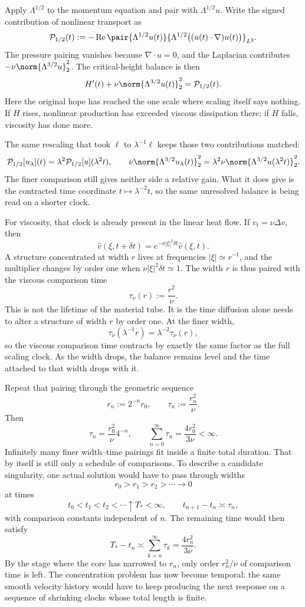 Apply \(\Lambda^{1/2}\) to the momentum equation and pair with \(\Lambda^{1/2}u\). Write the signed contribution of nonlinear transport as
\[
  \mathcal P_{1/2}(t)
  :=
  -\operatorname{Re}
  \pair
    {\Lambda^{1/2}u(t)}
    {\Lambda^{1/2}\bigl((u(t)\cdot\nabla)u(t)\bigr)}_{L^2}.
\]
The pressure pairing vanishes because \(\nabla\cdot u=0\), and the Laplacian contributes \(-\nu\norm{\Lambda^{3/2}u}_2^2\). The critical-height balance is then
\[
  H'(t)
  +
  \nu\norm{\Lambda^{3/2}u(t)}_2^2
  =
  \mathcal P_{1/2}(t).
\]
Here the original hope has reached the one scale where scaling itself says nothing. If \(H\) rises, nonlinear production has exceeded viscous dissipation there; if \(H\) falls, viscosity has done more.

The same rescaling that took \(\ell\) to \(\lambda^{-1}\ell\) keeps those two contributions matched:
\[
  \mathcal P_{1/2}[u_\lambda](t)
  =
  \lambda^2\mathcal P_{1/2}[u](\lambda^2t),
  \qquad
  \nu\norm{\Lambda^{3/2}u_\lambda(t)}_2^2
  =
  \lambda^2\nu\norm{\Lambda^{3/2}u(\lambda^2t)}_2^2.
\]
The finer comparison still gives neither side a relative gain. What it does give is the contracted time coordinate \(t\mapsto\lambda^{-2}t\), so the same unresolved balance is being read on a shorter clock.

For viscosity, that clock is already present in the linear heat flow. If \(v_t=\nu\Delta v\), then
\[
  \widehat v(\xi,t+\delta t)
  =
  e^{-\nu|\xi|^2\delta t}\widehat v(\xi,t).
\]
A structure concentrated at width \(r\) lives at frequencies \(|\xi|\simeq r^{-1}\), and the multiplier changes by order one when \(\nu|\xi|^2\delta t\simeq1\). The width \(r\) is thus paired with the viscous comparison time
\[
  \tau_\nu(r)
  :=
  \frac{r^2}{\nu}.
\]
This is not the lifetime of the material tube. It is the time diffusion alone needs to alter a structure of width \(r\) by order one. At the finer width,
\[
  \tau_\nu(\lambda^{-1}r)
  =
  \lambda^{-2}\tau_\nu(r),
\]
so the viscous comparison time contracts by exactly the same factor as the full \NavierStokes{} scaling clock. As the width drops, the balance remains level and the time attached to that width drops with it.

Repeat that pairing through the geometric sequence
\[
  r_n:=2^{-n}r_0,
  \qquad
  \tau_n:=\frac{r_n^2}{\nu}.
\]
Then
\[
  \tau_n
  =
  \frac{r_0^2}{\nu}4^{-n},
  \qquad
  \sum_{n=0}^{\infty}\tau_n
  =
  \frac{4r_0^2}{3\nu}
  <
  \infty.
\]
Infinitely many finer width--time pairings fit inside a finite total duration. That by itself is still only a schedule of comparisons. To describe a candidate singularity, one actual solution would have to pass through widths
\[
  r_0>r_1>r_2>\cdots\longrightarrow0
\]
at times
\[
  t_0<t_1<t_2<\cdots\uparrow T_*<\infty,
  \qquad
  t_{n+1}-t_n\asymp\tau_n,
\]
with comparison constants independent of \(n\). The remaining time would then satisfy
\[
  T_*-t_n
  \asymp
  \sum_{k=n}^{\infty}\tau_k
  =
  \frac{4r_n^2}{3\nu}.
\]
By the stage where the core has narrowed to \(r_n\), only order \(r_n^2/\nu\) of comparison time is left. The concentration problem has now become temporal: the same smooth velocity history would have to keep producing the next response on a sequence of shrinking clocks whose total length is finite.
